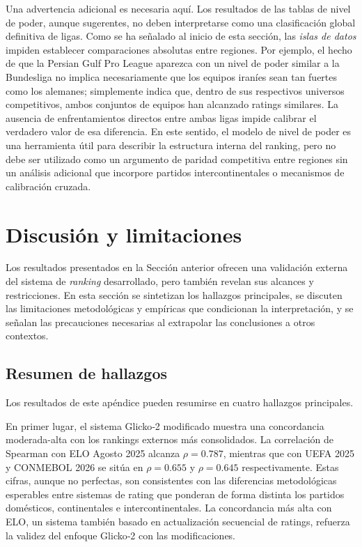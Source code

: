 Una advertencia adicional es necesaria aqu\'i. Los resultados de las tablas de nivel de poder, aunque sugerentes, no deben interpretarse como una clasificaci\'on global definitiva de ligas. Como se ha se\~nalado al inicio de esta secci\'on, las \emph{islas de datos} impiden establecer comparaciones absolutas entre regiones. Por ejemplo, el hecho de que la Persian Gulf Pro League aparezca con un nivel de poder similar a la Bundesliga no implica necesariamente que los equipos iran\'ies sean tan fuertes como los alemanes; simplemente indica que, dentro de sus respectivos universos competitivos, ambos conjuntos de equipos han alcanzado ratings similares. La ausencia de enfrentamientos directos entre ambas ligas impide calibrar el verdadero valor de esa diferencia. En este sentido, el modelo de nivel de poder es una herramienta \'util para describir la estructura interna del ranking, pero no debe ser utilizado como un argumento de paridad competitiva entre regiones sin un an\'alisis adicional que incorpore partidos intercontinentales o mecanismos de calibraci\'on cruzada.

\section{Discusi\'on y limitaciones}

Los resultados presentados en la Secci\'on anterior ofrecen una validaci\'on externa del sistema de \textit{ranking} desarrollado, pero tambi\'en revelan sus alcances y restricciones. En esta secci\'on se sintetizan los hallazgos principales, se discuten las limitaciones metodol\'ogicas y emp\'iricas que condicionan la interpretaci\'on, y se se\~nalan las precauciones necesarias al extrapolar las conclusiones a otros contextos. 

\subsection{Resumen de hallazgos}

Los resultados de este ap\'endice pueden resumirse en cuatro hallazgos principales.

En primer lugar, el sistema Glicko‑2 modificado muestra una concordancia moderada-alta con los rankings externos m\'as consolidados. La correlaci\'on de Spearman con ELO Agosto 2025 alcanza $\rho = 0.787$, mientras que con UEFA 2025 y CONMEBOL 2026 se sit\'ua en $\rho = 0.655$ y $\rho = 0.645$ respectivamente. Estas cifras, aunque no perfectas, son consistentes con las diferencias metodol\'ogicas esperables entre sistemas de rating que ponderan de forma distinta los partidos dom\'esticos, continentales e intercontinentales. La concordancia m\'as alta con ELO, un sistema tambi\'en basado en actualizaci\'on secuencial de ratings, refuerza la validez del enfoque Glicko‑2 con las modificaciones.

